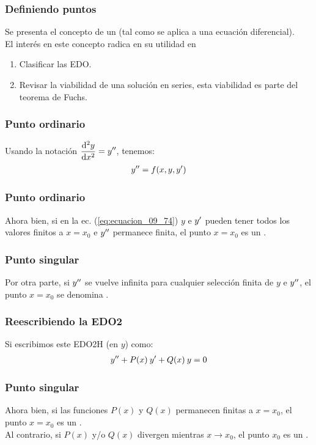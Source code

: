 \documentclass[12pt]{beamer}
\begin{document}
\begin{frame}
\frametitle{Definiendo puntos}
Se presenta el concepto de un  (tal como se aplica a una ecuación diferencial).
\\
\bigskip
\pause
El interés en este concepto radica en su utilidad en
\begin{enumerate}[<+->]
\item Clasificar las EDO.
\item Revisar la viabilidad de una solución en series, esta viabilidad es parte del teorema de Fuchs.
\end{enumerate}
\end{frame}
\begin{frame}
\frametitle{Punto ordinario}
Usando la notación $\displaystyle \dv[2]{y}{x} = {y}^{\prime \prime}$, tenemos:
\pause
\begin{align}
{y}^{\prime \prime} = f (x, y, {y}^{\prime})
\label{eq:ecuacion_09_74}
\end{align}
\end{frame}
\begin{frame}
\frametitle{Punto ordinario}
Ahora bien, si en la ec. (\ref{eq:ecuacion_09_74}) $y$ e ${y}^{\prime}$ pueden tener todos los valores finitos a $x = x_{0}$ e ${y}^{\prime \prime}$ permanece finita, \pause el punto $x = x_{0}$ es un .
\end{frame}
\begin{frame}
\frametitle{Punto singular}
Por otra parte, si ${y}^{\prime \prime}$ se vuelve infinita para cualquier selección finita de $y$ e  ${y}^{\prime \prime}$, \pause el punto $x = x_{0}$ se denomina .
\end{frame}
\begin{frame}
\frametitle{Reescribiendo la EDO2}
Si escribimos este EDO2H (en $y$) como:
\pause
\begin{align}
{y}^{\prime \prime} + P (x) \: {y}^{\prime} + Q (x) \: y = 0
\label{eq:ecuacion_09_75}
\end{align}
\end{frame}
\begin{frame}
\frametitle{Punto singular}
Ahora bien, si las funciones $P (x)$ y $Q (x)$ permanecen finitas a $x = x_{0}$, el punto $x = x_{0}$ es un .
\\
\bigskip
\pause
Al contrario, si $P (x)$ y/o $Q (x)$ divergen mientras $x \to x_{0}$, el punto $x_{0}$ es un .
\end{frame}
\end{document}
